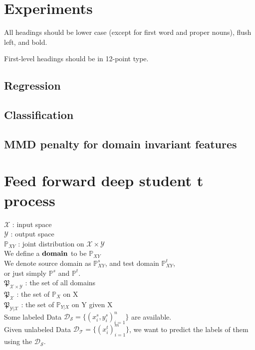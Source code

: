 \documentclass{article}
\begin{document}
\section{Experiments}
\label{headings}

All headings should be lower case (except for first word and proper
nouns), flush left, and bold.

First-level headings should be in 12-point type.

\subsection{Regression}

\subsection{Classification}

\subsection{MMD penalty for domain invariant features}


\section{Feed forward deep student t process}
$\mathcal{X} $ : input space\\
$\mathcal{Y}$ : output space\\
$\mathbb{P} _{XY}$ : joint distribution on $\mathcal{X} \times \mathcal{Y}$\\ 
We define a $\bold{domain}$ to be $\mathbb{P} _{XY}$\\
We denote source domain as $\mathbb{P} ^s _{XY}$, and test domain $\mathbb{P} ^t _{XY}$,\\
or just simply $\mathbb{P} ^s$ and $\mathbb{P} ^t $.\\
$\mathfrak{P} _{\mathcal{X} \times \mathcal{Y}}$ : the set of all domains\\
$\mathfrak{P} _\mathcal{X}$ : the set of $\mathbb{P} _X$ on X\\
$\mathfrak{P} _{\mathcal{Y}|\mathcal{X}}$ : the set of $\mathbb{P} _{Y|X}$ on Y given X
\\
Some labeled Data $\mathcal{D_S}= \{(x^s _i, y^s _i)_{i=1} ^{n}\}$ are available.\\
Given unlabeled Data $\mathcal{D_T}= \{(x^t _i)_{i=1} ^{m}\}$, we want to predict the labels of them using the  $\mathcal{D_S}$.
\end{document}
